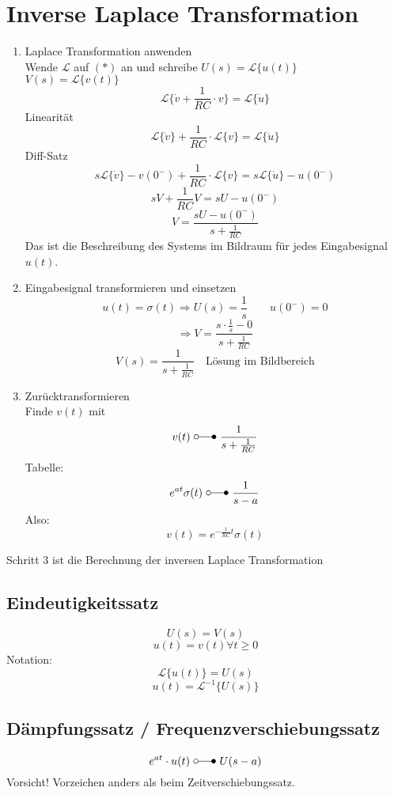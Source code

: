 \section{Inverse Laplace Transformation}
\begin{enumerate}
  \item Laplace Transformation anwenden\\
        Wende $\mathcal{L}$ auf $(*)$ an und schreibe 
        $U(s) = \mathcal{L} \{ u(t) \}$ \\
        $V(s) = \mathcal{L} \{ v(t) \}$ \\
        \[\mathcal{L} \{ \dot{v} + \frac{1}{RC} \cdot v \} 
        = \mathcal{L} \{ \dot{u} \}\]
        Linearität
        \[\mathcal{L} \{ \dot{v} \} + \frac{1}{RC} \cdot \mathcal{L} \{ v \} 
        = \mathcal{L} \{ \dot{u} \}\]
        Diff-Satz
        \[s \mathcal{L} \{ \dot{v} \} - v(0^-) 
        + \frac{1}{RC} \cdot \mathcal{L} \{ v \} 
        = s \mathcal{L} \{ \dot{u} \} - u(0^-) \]
        \[ s V + \frac{1}{RC} V = s U - u(0^-) \]
        \[ \boxed{V = \frac{s U - u(0^-)}{s + \frac{1}{RC}}} \]
        Das ist die Beschreibung des Systems im Bildraum für jedes 
        Eingabesignal $u(t)$. 
  \item Eingabesignal transformieren und einsetzen
        \[ u(t) = \sigma(t) \Rightarrow U(s) = \frac{1}{s} \qquad u(0^-) = 0 \]
        \[ \Rightarrow V = \frac{s \cdot \frac{1}{s} - 0}{s + \frac{1}{RC}} \]
        \[ \boxed{V(s) = \frac{1}{s + \frac{1}{RC}}} 
        \quad \text{Lösung im Bildbereich} \]
  \item Zurücktransformieren\\
        Finde $v(t)$ mit 
        \[ v(t) ~ \laplace ~ \frac{1}{s + \frac{1}{RC}} \]
        Tabelle: 
        \[ e^{at}\sigma(t) ~ \laplace ~ \frac{1}{s - a} \]
        Also: 
        \[ v(t) = e^{-\frac{1}{RC} t} \sigma(t) \]
\end{enumerate} 
Schritt 3 ist die Berechnung der inversen Laplace Transformation

\subsection{Eindeutigkeitssatz}
\[ U(s) = V(s) \]
\[ u(t) = v(t) \forall t \geq 0 \]
Notation: 
\[ \mathcal{L} \{ u(t) \} = U(s) \]
\[ u(t) = \mathcal{L}^{-1} \{ U(s) \} \]

\subsection{Dämpfungssatz / Frequenzverschiebungssatz}
\[ e^{at} \cdot u(t) ~ \laplace ~ U(s - a) \]
Vorsicht! Vorzeichen anders als beim Zeitverschiebungssatz. 

